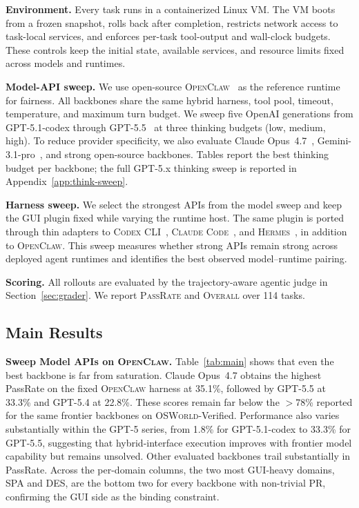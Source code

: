 \documentclass{llmxive}
\providecommand{\osworld}{\textsc{OSWorld}\xspace}
\begin{document}
\smallskip
\noindent\textbf{Environment.}
Every task runs in a containerized Linux VM. The VM boots from a frozen snapshot, rolls back after completion, restricts network access to task-local services, and enforces per-task tool-output and wall-clock budgets. These controls keep the initial state, available services, and resource limits fixed across models and runtimes.

\smallskip
\noindent\textbf{Model-API sweep.}
We use open-source \textsc{OpenClaw}~\citep{openclaw2025} as the reference runtime for fairness. All backbones share the same hybrid harness, tool pool, timeout, temperature, and maximum turn budget. We sweep five OpenAI generations from GPT-5.1-codex through GPT-5.5~\citep{openai2026gpt55} at three thinking budgets (low, medium, high). To reduce provider specificity, we also evaluate Claude Opus~4.7~\citep{anthropic2026opus47}, Gemini-3.1-pro~\citep{google2026gemini31pro}, and strong open-source backbones. Tables report the best thinking budget per backbone; the full GPT-5.x thinking sweep is reported in Appendix~\ref{app:think-sweep}.

\smallskip
\noindent\textbf{Harness sweep.}
We select the strongest APIs from the model sweep and keep the GUI plugin fixed while varying the runtime host. The same plugin is ported through thin adapters to \textsc{Codex CLI}~\citep{openai2026codexagent}, \textsc{Claude Code}~\citep{anthropic2025claudecode}, and \textsc{Hermes}~\citep{hermes2025}, in addition to \textsc{OpenClaw}. This sweep measures whether strong APIs remain strong across deployed agent runtimes and identifies the best observed model--runtime pairing.

\smallskip
\noindent\textbf{Scoring.}
All rollouts are evaluated by the trajectory-aware agentic judge in Section~\ref{sec:grader}. We report \textsc{PassRate} and \textsc{Overall} over 114 tasks.

\subsection{Main Results}
\label{sec:main-results}

\noindent\textbf{Sweep Model APIs on \textsc{OpenClaw}.}
Table~\ref{tab:main} shows that even the best backbone is far from saturation. Claude Opus~4.7 obtains the highest PassRate on the fixed \textsc{OpenClaw} harness at 35.1\%, followed by GPT-5.5 at 33.3\% and GPT-5.4 at 22.8\%. These scores remain far below the $>$78\% reported for the same frontier backbones on \osworld{}-Verified. Performance also varies substantially within the GPT-5 series, from 1.8\% for GPT-5.1-codex to 33.3\% for GPT-5.5, suggesting that hybrid-interface execution improves with frontier model capability but remains unsolved. Other evaluated backbones trail substantially in PassRate. Across the per-domain columns, the two most GUI-heavy domains, SPA and DES, are the bottom two for every backbone with non-trivial PR, confirming the GUI side as the binding constraint.
\end{document}
